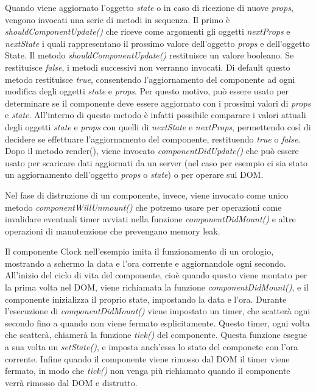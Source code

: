 Quando viene aggiornato l'oggetto \textit{state} o in caso di ricezione di nuove \textit{props}, vengono invocati una serie di metodi in sequenza.
Il primo è \textit{shouldComponentUpdate()} che riceve come argomenti gli oggetti \textit{nextProps} e \textit{nextState} i quali rappresentano il prossimo valore dell'oggetto \textit{props} e dell'oggetto State. Il metodo \textit{shouldComponentUpdate()} restituisce un valore booleano. Se restituisce \textit{false}, i metodi successivi non verranno invocati. Di default questo metodo restituisce \textit{true}, consentendo l'aggiornamento del componente ad ogni modifica degli oggetti \textit{state} e \textit{props}. Per questo motivo, può essere usato per determinare se il componente deve essere aggiornato con i prossimi valori di \textit{props} e \textit{state}. All'interno di questo metodo è infatti possibile comparare i valori attuali degli oggetti \textit{state} e \textit{props} con quelli di \textit{nextState} e \textit{nextProps}, permettendo così di decidere se effettuare l'aggiornamento del componente, restituendo \textit{true} o \textit{false}.
Dopo il metodo render(), viene invocato \textit{componentDidUpdate()} che può essere usato per scaricare dati aggiornati da un server (nel caso per esempio ci sia stato un aggiornamento dell'oggetto \textit{props} o \textit{state}) o per operare sul DOM.

Nel fase di distruzione di un componente, invece, viene invocato come unico metodo \textit{componentWillUnmount()} che potremo usare per operazioni come invalidare eventuali timer avviati nella funzione \textit{componentDidMount()} e altre operazioni di manutenzione che prevengano memory leak.



Il componente Clock nell'esempio imita il funzionamento di un orologio, mostrando a schermo la data
e l’ora corrente e aggiornandole ogni secondo. All’inizio del ciclo di vita del componente,
cioè quando questo viene montato per la prima volta nel DOM, viene richiamata la funzione \textit{componentDidMount()}, e il componente inizializza il proprio state, impostando
la data e l’ora.
Durante l’esecuzione di \textit{componentDidMount()} viene impostato un timer, che scatterà
ogni secondo fino a quando non viene fermato esplicitamente. Questo timer, ogni volta
che scatterà, chiamerà la funzione \textit{tick()} del componente. Questa funzione esegue a
sua volta un \textit{setState()}, e imposta anch’essa lo stato del componete con l’ora corrente.
Infine quando il componente viene rimosso dal DOM il timer viene fermato, in modo che
\textit{tick()} non venga più richiamato quando il componente verrà rimosso dal DOM e distrutto.

